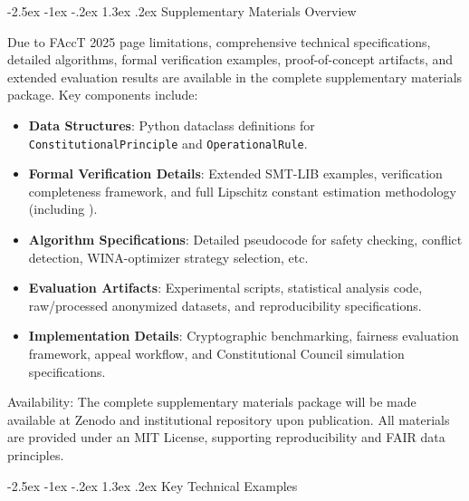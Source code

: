 \documentclass[manuscript,screen,9pt]{acmart}
\makeatletter
\renewcommand\section{\@startsection{section}{1}{\z@}%
  {-2.5ex \@plus -1ex \@minus -.2ex}%
  {1.3ex \@plus.2ex}%
  {\normalfont\Large\bfseries}}
\makeatother
\begin{document}
\section{Supplementary Materials Overview}
\label{app:supplementary}

Due to FAccT 2025 page limitations, comprehensive technical specifications, detailed algorithms, formal verification examples, proof-of-concept artifacts, and extended evaluation results are available in the complete supplementary materials package. Key components include:
\begin{itemize}[leftmargin=*,itemsep=1pt,parsep=1pt]
	\item \textbf{Data Structures}: Python dataclass definitions for \texttt{ConstitutionalPrinciple} and \texttt{OperationalRule}.
	\item \textbf{Formal Verification Details}: Extended SMT-LIB examples, verification completeness framework, and full Lipschitz constant estimation methodology (including ).
	\item \textbf{Algorithm Specifications}: Detailed pseudocode for safety checking, conflict detection, WINA-optimizer strategy selection, etc.
	\item \textbf{Evaluation Artifacts}: Experimental scripts, statistical analysis code, raw/processed anonymized datasets, and reproducibility specifications.
	\item \textbf{Implementation Details}: Cryptographic benchmarking, fairness evaluation framework, appeal workflow, and Constitutional Council simulation specifications.
\end{itemize}
Availability: The complete supplementary materials package will be made available at Zenodo and institutional repository upon publication. All materials are provided under an MIT License, supporting reproducibility and FAIR data principles.

\section{Key Technical Examples}
\label{app:key_examples}
\end{document}
